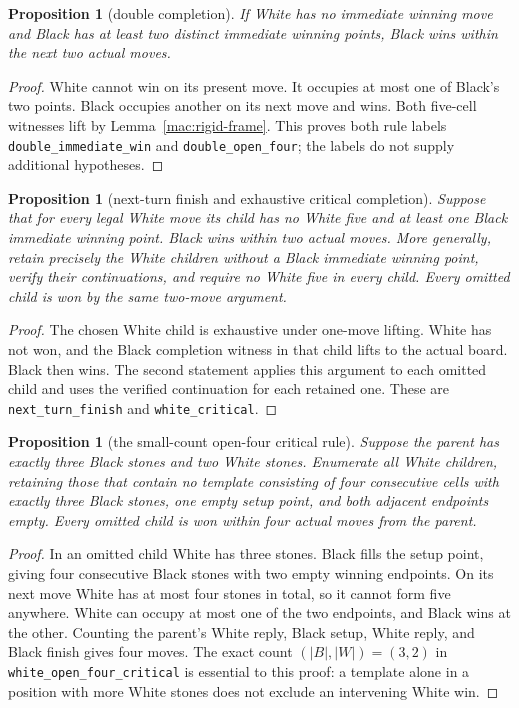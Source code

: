 \documentclass[11pt]{article}
\newtheorem{proposition}[theorem]{Proposition}
\theoremstyle{definition}
\theoremstyle{remark}
\begin{document}
\begin{proposition}[double completion]\label{mac:double-completion}
If White has no immediate winning move and Black has at least two distinct immediate winning points, Black wins within the next two actual moves.

\end{proposition}
\begin{proof}
White cannot win on its present move. It occupies at most one of Black's two points. Black occupies another on its next move and wins. Both five-cell witnesses lift by Lemma~\ref{mac:rigid-frame}. This proves both rule labels \texttt{double\_immediate\_win} and \texttt{double\_open\_four}; the labels do not supply additional hypotheses. 
\end{proof}

\begin{proposition}[next-turn finish and exhaustive critical completion]\label{mac:finish-critical}
Suppose that for every legal White move its child has no White five and at least one Black immediate winning point. Black wins within two actual moves. More generally, retain precisely the White children without a Black immediate winning point, verify their continuations, and require no White five in every child. Every omitted child is won by the same two-move argument.

\end{proposition}
\begin{proof}
The chosen White child is exhaustive under one-move lifting. White has not won, and the Black completion witness in that child lifts to the actual board. Black then wins. The second statement applies this argument to each omitted child and uses the verified continuation for each retained one. These are \texttt{next\_turn\_finish} and \texttt{white\_critical}. 
\end{proof}

\begin{proposition}[the small-count open-four critical rule]\label{mac:small-open-four}
Suppose the parent has exactly three Black stones and two White stones. Enumerate all White children, retaining those that contain no template consisting of four consecutive cells with exactly three Black stones, one empty setup point, and both adjacent endpoints empty. Every omitted child is won within four actual moves from the parent.

\end{proposition}
\begin{proof}
In an omitted child White has three stones. Black fills the setup point, giving four consecutive Black stones with two empty winning endpoints. On its next move White has at most four stones in total, so it cannot form five anywhere. White can occupy at most one of the two endpoints, and Black wins at the other. Counting the parent's White reply, Black setup, White reply, and Black finish gives four moves. The exact count \((|B|,|W|)=(3,2)\) in \texttt{white\_open\_four\_critical} is essential to this proof: a template alone in a position with more White stones does not exclude an intervening White win. 
\end{proof}
\end{document}
